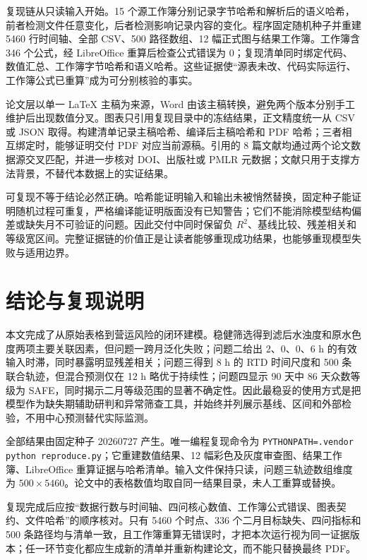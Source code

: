 \documentclass[UTF8,12pt,a4paper]{ctexart}
\newcommand{\Rtwo}{R^{2}}
\begin{document}
复现链从只读输入开始。15 个源工作簿分别记录字节哈希和解析后的语义哈希，前者检测文件任意变化，后者检测影响记录内容的变化。程序固定随机种子并重建 5460 行时间轴、全部 CSV、500 路径数组、12 幅正式图与结果工作簿。工作簿含 346 个公式，经 LibreOffice 重算后检查公式错误为 0；复现清单同时绑定代码、数值汇总、工作簿字节哈希和语义哈希。这些证据使“源表未改、代码实际运行、工作簿公式已重算”成为可分别核验的事实。

论文层以单一 \LaTeX{} 主稿为来源，Word 由该主稿转换，避免两个版本分别手工维护后出现数值分叉。图表只引用复现目录中的冻结结果，正文精度统一从 CSV 或 JSON 取得。构建清单记录主稿哈希、编译后主稿哈希和 PDF 哈希；三者相互绑定时，能够证明交付 PDF 对应当前源稿。引用的 8 篇文献均通过两个论文数据源交叉匹配，并进一步核对 DOI、出版社或 PMLR 元数据；文献只用于支撑方法背景，不替代本数据上的实证结果。

可复现不等于结论必然正确。哈希能证明输入和输出未被悄然替换，固定种子能证明随机过程可重复，严格编译能证明版面没有已知警告；它们不能消除模型结构偏差或缺失月不可验证的问题。因此交付中同时保留负 $\Rtwo$、基线比较、残差相关和等级宽区间。完整证据链的价值正是让读者能够重现成功结果，也能够重现模型失败与适用边界。

\section{结论与复现说明}

本文完成了从原始表格到营运风险的闭环建模。稳健筛选得到滤后水浊度和原水色度两项主要关联因素，但问题一跨月泛化失败；问题二给出 2、0、0、6 h 的有效输入时滞，同时暴露明显残差相关；问题三得到 8 h 的 RTD 时间尺度和 500 条联合轨迹，但混合预测仅在 12 h 略优于持续性；问题四显示 90 天中 86 天众数等级为 SAFE，同时揭示二月等级范围的显著不确定性。因此最稳妥的使用方式是把模型作为缺失期辅助研判和异常筛查工具，并始终并列展示基线、区间和外部检验，不用中心预测替代实际监测。

全部结果由固定种子 20260727 产生。唯一编程复现命令为 \texttt{PYTHONPATH=.vendor python reproduce.py}；它重建数值结果、12 幅彩色及灰度审查图、结果工作簿、LibreOffice 重算证据与哈希清单。输入文件保持只读，问题三轨迹数组维度为 $500\times5460$。论文中的表格数值均取自同一结果目录，未人工重算或替换。

复现完成后应按“数据行数与时间轴、四问核心数值、工作簿公式错误、图表契约、文件哈希”的顺序核对。只有 5460 个时点、336 个二月目标缺失、四问指标和 500 条路径均与清单一致，且工作簿重算无错误时，才把本次运行视为同一证据版本；任一环节变化都应生成新的清单并重新构建论文，而不能只替换最终 PDF。



\end{document}
